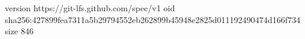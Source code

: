 version https://git-lfs.github.com/spec/v1
oid sha256:427899fea7311a5b29794552eb262899b45948e2825d011192490474d166f734
size 846
